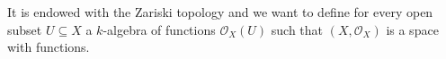 \documentclass[12pt,a4paper]{book}
\theoremstyle{definition}
\begin{document}
It is endowed with the Zariski topology and we want to define for every open subset $U \subseteq X$ a $k$-algebra of functions $\mathscr{O}_X(U)$ such that $\left(X, \mathscr{O}_X\right)$ is a space with functions.                                                                                                                                                                                                                                                                                                                                                                                                                                                                                                                                                                                                                                                                                                                                                                                                                                                                                                                                                                                                                                                                                                                                                                                                                                                                                                                                                                                                                                                                                                                                                                                                                                                                                                                                                                                                                                                                                                                                                                                                                                                                                                                                                                                                                                                                                                                                                                                                                                                                                                                                                                                                                                                                                                                                                                                                                                                                                                                                                                                                                                                                                                                                                                                                                                                  
\end{document}
